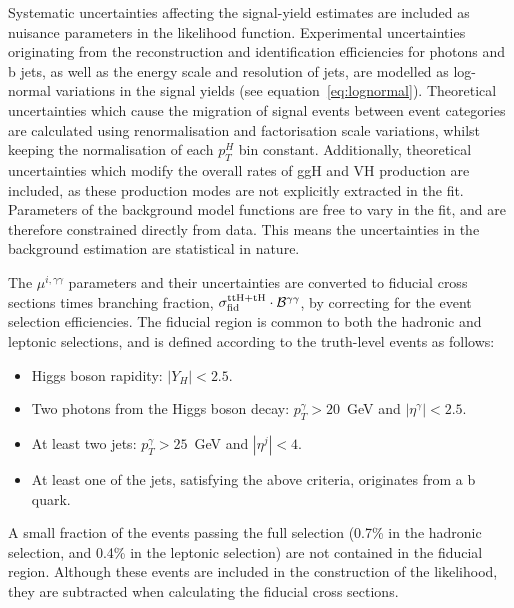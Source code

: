 Systematic uncertainties affecting the signal-yield estimates are included as nuisance parameters in the likelihood function. Experimental uncertainties originating from the reconstruction and identification efficiencies for photons and b jets, as well as the energy scale and resolution of jets, are modelled as log-normal variations in the signal yields (see equation~\ref{eq:lognormal}). Theoretical uncertainties which cause the migration of signal events between event categories are calculated using renormalisation and factorisation scale variations, whilst keeping the normalisation of each $p_T^H$ bin constant. Additionally, theoretical uncertainties which modify the overall rates of ggH and VH production are included, as these production modes are not explicitly extracted in the fit. Parameters of the background model functions are free to vary in the fit, and are therefore constrained directly from data. This means the uncertainties in the background estimation are statistical in nature.

The $\mu^{i,\gamma\gamma}$ parameters and their uncertainties are converted to fiducial cross sections times branching fraction, $\sigma^{\rm{ttH+tH}}_{\rm{fid}}\cdot\mathcal{B}^{\gamma\gamma}$, by correcting for the event selection efficiencies. The fiducial region is common to both the hadronic and leptonic selections, and is defined according to the truth-level events as follows:
\begin{itemize}
    \item Higgs boson rapidity: $|Y_H|<2.5$.
    \item Two photons from the Higgs boson decay: $p_T^\gamma > 20$~GeV and $|\eta^\gamma|<2.5$.
    \item At least two jets: $p_T^\gamma > 25$~GeV and $|\eta^j|<4$.
    \item At least one of the jets, satisfying the above criteria, originates from a b quark.
\end{itemize}
\noindent
A small fraction of the events passing the full selection (0.7\% in the hadronic selection, and 0.4\% in the leptonic selection) are not contained in the fiducial region. Although these events are included in the construction of the likelihood, they are subtracted when calculating the fiducial cross sections.

